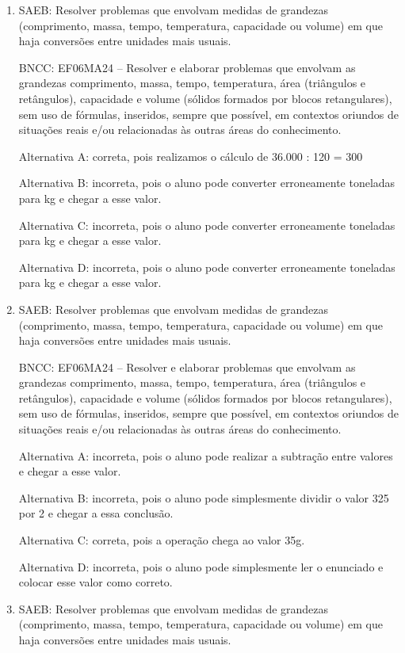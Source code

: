 	\begin{enumerate}

		\item SAEB: Resolver problemas que envolvam medidas de grandezas (comprimento,
massa, tempo, temperatura, capacidade ou volume) em que haja conversões
entre unidades mais usuais.

BNCC: EF06MA24 -- Resolver e elaborar problemas que envolvam as
grandezas comprimento, massa, tempo, temperatura, área (triângulos e
retângulos), capacidade e volume (sólidos formados por blocos
retangulares), sem uso de fórmulas, inseridos, sempre que possível, em
contextos oriundos de situações reais e/ou relacionadas às outras áreas
do conhecimento.

Alternativa A: correta, pois realizamos o cálculo de 36.000 : 120 = 300

Alternativa B: incorreta, pois o aluno pode converter erroneamente
toneladas para kg e chegar a esse valor.

Alternativa C: incorreta, pois o aluno pode converter erroneamente
toneladas para kg e chegar a esse valor.

Alternativa D: incorreta, pois o aluno pode converter erroneamente
toneladas para kg e chegar a esse valor.

		\item SAEB: Resolver problemas que envolvam medidas de grandezas (comprimento,
massa, tempo, temperatura, capacidade ou volume) em que haja conversões
entre unidades mais usuais.

BNCC: EF06MA24 -- Resolver e elaborar problemas que envolvam as
grandezas comprimento, massa, tempo, temperatura, área (triângulos e
retângulos), capacidade e volume (sólidos formados por blocos
retangulares), sem uso de fórmulas, inseridos, sempre que possível, em
contextos oriundos de situações reais e/ou relacionadas às outras áreas
do conhecimento.

Alternativa A: incorreta, pois o aluno pode realizar a subtração entre
valores e chegar a esse valor.

Alternativa B: incorreta, pois o aluno pode simplesmente dividir o valor
325 por 2 e chegar a essa conclusão.

Alternativa C: correta, pois a operação chega ao valor 35g.

Alternativa D: incorreta, pois o aluno pode simplesmente ler o enunciado
e colocar esse valor como correto.

		\item SAEB: Resolver problemas que envolvam medidas de grandezas (comprimento,
massa, tempo, temperatura, capacidade ou volume) em que haja conversões
entre unidades mais usuais.


\end{enumerate}
